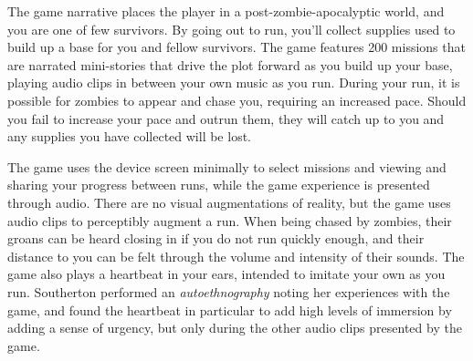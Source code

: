The game narrative places the player in a post-zombie-apocalyptic world, and you are one of few survivors. By going out to run, you'll collect supplies used to build up a base for you and fellow survivors. The game features 200 missions that are narrated mini-stories that drive the plot forward as you build up your base, playing audio clips in between your own music as you run. During your run, it is possible for zombies to appear and chase you, requiring an increased pace. Should you fail to increase your pace and outrun them, they will catch up to you and any supplies you have collected will be lost.

The game uses the device screen minimally to select missions and viewing and sharing your progress between runs, while the game experience is presented through audio. There are no visual augmentations of reality, but the game uses audio clips to perceptibly augment a run. When being chased by zombies, their groans can be heard closing in if you do not run quickly enough, and their distance to you can be felt through the volume and intensity of their sounds. The game also plays a heartbeat in your ears, intended to imitate your own as you run. Southerton \cite{southerton2013zombies} performed an \emph{autoethnography} noting her experiences with the game, and found the heartbeat in particular to add high levels of immersion by adding a sense of urgency, but only during the other audio clips presented by the game.

